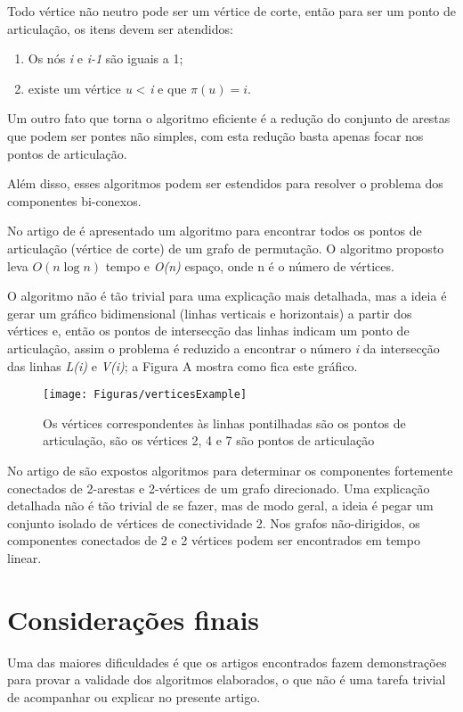 \documentclass[
	article,
	12pt,
	openright,
	oneside,
	a4paper,
	english,
	french,
	spanish,
	brazil
	]{abntex2}
\begin{document}
Todo vértice não neutro pode ser um vértice de corte, então para ser um ponto de articulação, os itens devem ser atendidos:

\begin{enumerate}
\item Os nós \textit{i} e \textit{i-1} são iguais a 1;
\item existe um vértice \textit{u} < \textit{i} e que $\pi(u)=i$.
\end{enumerate}

Um outro fato que torna o algoritmo eficiente é a redução do conjunto de arestas que podem ser pontes não simples, com esta redução basta apenas focar nos pontos de articulação.

Além disso, esses algoritmos podem ser estendidos para resolver o problema dos componentes bi-conexos.

No artigo de \cite{madhumangal1998} é apresentado um algoritmo para encontrar todos os pontos de articulação (vértice de corte) de um grafo de permutação. O algoritmo proposto leva $O(n \log n)$ tempo e \textit{O(n)} espaço, onde n é o número de vértices.

O algoritmo não é tão trivial para uma explicação mais detalhada, mas a ideia é gerar um gráfico bidimensional (linhas verticais e horizontais) a partir dos vértices e, então os pontos de intersecção das linhas indicam um ponto de articulação, assim o problema é reduzido a encontrar o número \textit{i} da intersecção das linhas \textit{L(i)} e \textit{V(i)}; a Figura A mostra como fica este gráfico.


\begin{figure*}
\centering
\caption{Os vértices correspondentes às linhas pontilhadas são os pontos de articulação, são os vértices 2, 4 e 7 são pontos de articulação}
\texttt{[image: Figuras/verticesExample]}
\end{figure*}

No artigo de \cite{henzinger2015} são expostos algoritmos para determinar os componentes fortemente conectados de 2-arestas e 2-vértices de um grafo direcionado. Uma explicação detalhada não é tão trivial de se fazer, mas de modo geral, a ideia é pegar um conjunto isolado de vértices de conectividade 2. Nos grafos não-dirigidos, os componentes conectados de 2 e 2 vértices podem ser encontrados em tempo linear.

\section{Considerações finais}
Uma das maiores dificuldades é que os artigos encontrados fazem demonstrações para provar a validade dos algoritmos elaborados, o que não é uma tarefa trivial de acompanhar ou explicar no presente artigo.
\end{document}
